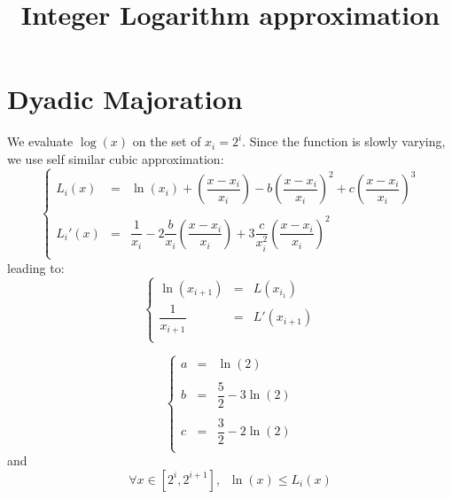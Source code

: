 \documentclass[aps]{revtex4}
\begin{document}
\title{Integer Logarithm approximation}
\maketitle

\section{Dyadic Majoration}
We evaluate $\log(x)$ on the set of $x_i=2^i$.
Since the function is slowly varying, we use self similar cubic approximation:
\begin{equation}
\left\lbrace
\begin{array}{rcl}
	L_i(x)  & = & \ln(x_i) + \left(\dfrac{x-x_i}{x_i}\right) - b \left(\dfrac{x-x_i}{x_i}\right)^2 + c\left(\dfrac{x-x_i}{x_i}\right)^3\\
	\\
	L_i'(x) & = & \dfrac{1}{x_i} - 2\dfrac{b}{x_i} \left(\dfrac{x-x_i}{x_i}\right) + 3 \dfrac{c}{x_i^2}  \left(\dfrac{x-x_i}{x_i}\right)^2 \\
\end{array}
\right.
\end{equation}
leading to:
\begin{equation}
\left\lbrace
\begin{array}{rcl}
	\ln(x_{i+1})       & = & L(x_{i_1})\\
	\dfrac{1}{x_{i+1}} & = & L'(x_{i+1}) \\
\end{array}
\right.
\end{equation}

\begin{equation}
\left\lbrace
\begin{array}{rcl}
a & = & \ln(2) \\
\\
b & = & \dfrac{5}{2}-3\ln(2)\\
\\
c & = & \dfrac{3}{2}-2\ln(2)\\
\end{array}
\right.
\end{equation}
and
\begin{equation}
\boxed{
\forall x\in[2^i,2^{i+1}], \;\; \ln(x) \leq L_i(x) 
}
\end{equation}
\end{document}
